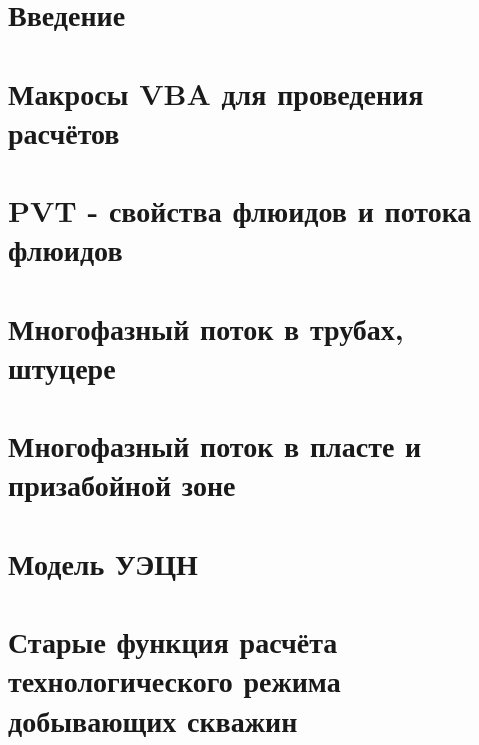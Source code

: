 \documentclass[a4paper,14pt,oneside,openany]{memoir}
\begin{document}
	
	
	\chapter*{Введение}                         %
	\chapter{Макросы VBA для проведения расчётов}
	\chapter{PVT - свойства флюидов и потока флюидов}
	\chapter{Многофазный поток в трубах, штуцере }
	\chapter{Многофазный поток в пласте и призабойной зоне}
	\chapter{Модель УЭЦН}
    \chapter{Старые функция расчёта технологического режима добывающих скважин}
	
\end{document}
